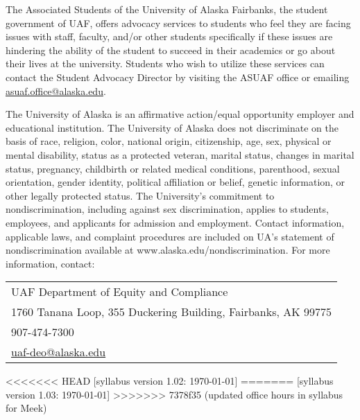 \documentclass[12pt]{article}
\def\mailto#1{\href{mailto:#1}{#1}}
\begin{document}
The Associated Students of the University of Alaska Fairbanks, the student government of UAF, offers advocacy services to students who feel they are facing issues with staff, faculty, and/or other students specifically if these issues are hindering the ability of the student to succeed in their academics or go about their lives at the university. Students who wish to utilize these services can contact the Student Advocacy Director by visiting the ASUAF office or emailing \mailto{asuaf.office@alaska.edu}.

The University of Alaska is an affirmative action/equal opportunity employer and educational institution. The University of Alaska does not discriminate on the basis of race, religion, color, national origin, citizenship, age, sex, physical or mental disability, status as a protected veteran, marital status, changes in marital status, pregnancy, childbirth or related medical conditions, parenthood, sexual orientation, gender identity, political affiliation or belief, genetic information, or other legally protected status. The University's commitment to nondiscrimination, including against sex discrimination, applies to students, employees, and applicants for admission and employment. Contact information, applicable laws, and complaint procedures are included on UA's statement of nondiscrimination available at www.alaska.edu/nondiscrimination. For more information, contact:

\begin{tabular}{l}
UAF Department of Equity and Compliance\\
1760 Tanana Loop, 355 Duckering Building, Fairbanks, AK  99775\\
907-474-7300\\
\mailto{uaf-deo@alaska.edu}
\end{tabular}


<<<<<<< HEAD
\hfill  \scriptsize [syllabus version 1.02: \today] \normalsize
=======
\hfill  \scriptsize [syllabus version 1.03: \today] \normalsize
>>>>>>> 7378f35 (updated office hours in syllabus for Meek)
\end{document}
